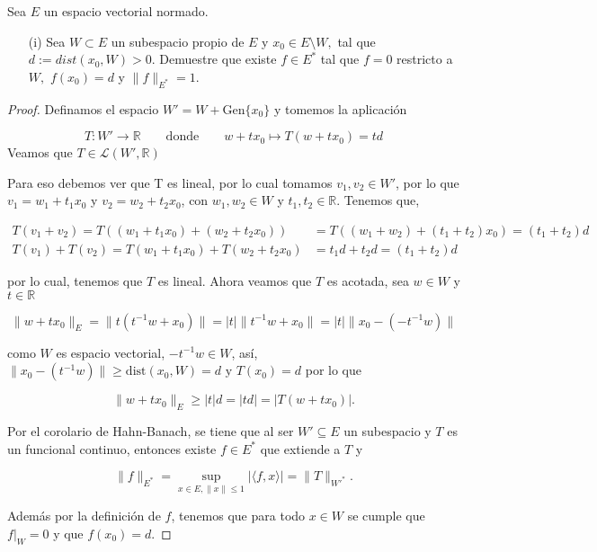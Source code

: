 Sea $E$ un espacio vectorial normado.
\begin{itemize}
    \item[(i)] Sea $W\subset E$ un subespacio propio de $E$ y $x_0\in E\setminus W,$ tal que $d:=dist(x_0,W)>0.$ Demuestre que existe $f\in E^*$ tal que $f=0$ restricto a $W,$ $f(x_0)=d$ y $\|f\|_{E^*}=1.$
\end{itemize} 

\begin{proof}
    

Definamos el espacio \(W' = W + \text{Gen}\{x_0\}\) y tomemos la aplicación

$$
T : W' \longrightarrow \mathbb{R}
\qquad\text{donde}\qquad
w + t x_0 \mapsto T(w + t x_0) = t d
$$
Veamos que \(T \in \mathcal{L}(W', \mathbb{R})\)

Para eso debemos ver que T es lineal, por lo cual tomamos \(v_1, v_2 \in W'\), por lo que \(v_1 = w_1 + t_1 x_0\) y \(v_2 = w_2 + t_2 x_0\), con \(w_1, w_2 \in W\) y \(t_1, t_2 \in \mathbb{R}\). Tenemos que, 

\begin{align*}
T(v_1 + v_2) = T\left((w_1 + t_1 x_0) + (w_2 + t_2 x_0)\right)
&= T((w_1 + w_2) + (t_1 + t_2)x_0)
= (t_1 + t_2)d \\
T(v_1) + T(v_2) = T(w_1 + t_1 x_0) + T(w_2 + t_2 x_0) &= t_1 d + t_2 d = (t_1 + t_2)d
\end{align*}

por lo cual, tenemos que $T$ es lineal. Ahora veamos que $T$ es acotada, sea \(w \in W\) y \(t \in \mathbb{R}\)

$$
\| w + t x_0 \|_E = \| t(t^{-1} w + x_0) \| = |t| \| t^{-1} w + x_0 \| = |t| \| x_0 - (-t^{-1} w) \|
$$

como \(W\) es espacio vectorial, \(-t^{-1}w \in W\), así, $
\| x_0 - (t^{-1} w) \| \geq \text{dist}(x_0, W) = d
\text{ y } T(x_0) = d$ por lo que



$$
\| w + t x_0 \|_E \geq |t| d = |t d| = |T(w + t x_0)|.
$$

Por el corolario de Hahn-Banach, se tiene que al ser \(W' \subseteq E\) un subespacio y \(T\) es un funcional continuo, entonces existe \(f \in E^*\) que extiende a \(T\) y

$$
\|f\|_{E^*} = \sup_{x \in E, \|x\| \leq 1} | \langle f, x \rangle | = \|T\|_{W'^*}.
$$

Además por la definición de $f$, tenemos que para todo $x\in W$ se cumple que $f|_W = 0$ y que $ f(x_0) =d$.
 

\end{proof}
